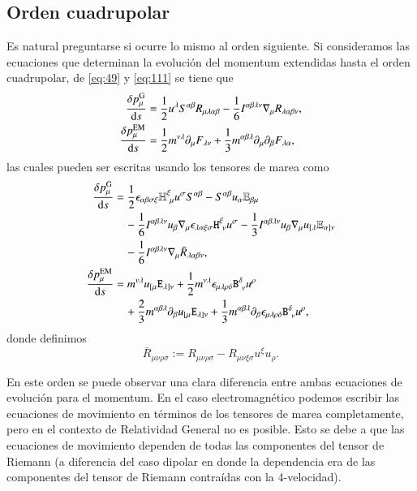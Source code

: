 \subsection{Orden cuadrupolar}

Es natural preguntarse si ocurre lo mismo al orden siguiente. Si consideramos las ecuaciones que determinan la evolución del momentum extendidas hasta el orden cuadrupolar, de \eqref{eq:49} y \eqref{eq:111} se tiene que 
\begin{align}
\frac{\delta p_{\mu}^{\mathrm{G}}}{\mathrm{d}s} &= \frac{1}{2} u^{\lambda} S^{\alpha \beta} R_{\mu \lambda \alpha \beta} - \frac{1}{6} I^{\alpha \beta \lambda \nu} \nabla_{\mu} R_{\lambda \alpha \beta \nu}, \\
\frac{\delta p_{\mu}^{\mathrm{EM}}}{\mathrm{d}s} &= \frac{1}{2} m^{\nu \lambda} \partial_{\mu} F_{\lambda \nu} + \frac{1}{3} m^{\alpha \beta \lambda} \partial_{\mu} \partial_{\beta} F_{\lambda \alpha},
\end{align}
las cuales pueden ser escritas usando los tensores de marea como
\begin{align}
\nonumber
\cd{p_{\mu}^{\mathrm{G}}} &= \frac{1}{2} \epsilon_{\alpha \beta \sigma \xi} \mathbb{H}^{\xi}_{\ \mu} u^{\sigma} S^{\alpha \beta} - S^{\alpha \beta} u_{\alpha} \mathbb{E}_{\beta \mu} \\
\nonumber
& \quad - \frac{1}{6} I^{\alpha \beta \lambda \nu} u_{\beta} \nabla_{\mu} \epsilon_{\lambda \alpha \xi \sigma} \mathtt{H}^{\xi}_{\ \nu} u^{\sigma} - \frac{1}{3} I^{\alpha \beta \lambda \nu} u_{\beta} \nabla_{\mu}
u_{[\lambda} \mathbb{E}_{\alpha ] \nu} \nonumber \\
\label{eq:115}
& \quad - \frac{1}{6} I^{\alpha \beta \lambda \nu} \nabla_{\mu} \bar{R}_{\lambda \alpha \beta \nu}, \\
\cd{p_{\mu}^{\mathrm{EM}}} &= m^{\nu \lambda} u_{[ \mu} \mathtt{E}_{\lambda ] \nu} + \frac{1}{2} m^{\nu \lambda} \epsilon_{\mu \lambda \rho \delta} \mathtt{B}^{\delta}_{\ \nu} u^{\rho} \nonumber \\
\label{eq:114}
& \quad + \frac{2}{3} m^{\alpha \beta \lambda} \partial_{\beta} u_{[\mu} \mathtt{E_{\lambda]\nu}} + \frac{1}{3} m^{\alpha \beta \lambda} \partial_{\beta} \epsilon_{\mu \lambda \rho \delta} \mathtt{B}^{\delta}_{\ \nu} u^{\rho},
\end{align}
donde definimos
\begin{equation}
\bar{R}_{\mu \nu \rho \sigma} := R_{\mu \nu \rho \sigma} - R_{\mu \nu \xi \sigma} u^{\xi} u_{\rho}.
\end{equation}

En este orden se puede observar una clara diferencia entre ambas ecuaciones de evolución para el momentum. En el caso electromagnético podemos escribir las ecuaciones de movimiento en términos de los tensores de marea completamente, pero en el contexto de Relatividad General no es posible. Esto se debe a que las ecuaciones de movimiento dependen de todas las componentes del tensor de Riemann (a diferencia del caso dipolar en donde la dependencia era de las componentes del tensor de Riemann contraídas con la 4-velocidad). 

